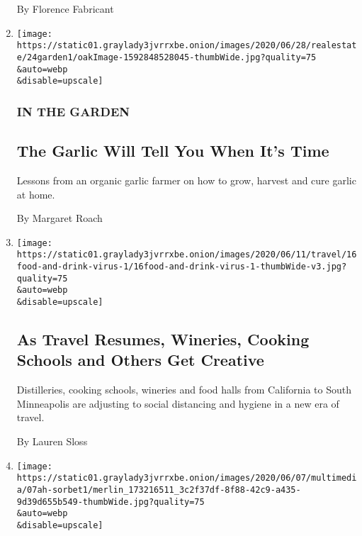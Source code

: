\begin{enumerate}
  By Florence Fabricant
\item
  \href{/2020/06/24/realestate/grow-garlic-garden-organic.html}{}

  \texttt{[image: https://static01.graylady3jvrrxbe.onion/images/2020/06/28/realestate/24garden1/oakImage-1592848528045-thumbWide.jpg?quality=75\\\&auto=webp\\\&disable=upscale]}

  \hypertarget{in-the-garden}{%
  \subsubsection{IN THE GARDEN}\label{in-the-garden}}

  \hypertarget{the-garlic-will-tell-you-when-its-time}{%
  \subsection{The Garlic Will Tell You When It's
  Time}\label{the-garlic-will-tell-you-when-its-time}}

  Lessons from an organic garlic farmer on how to grow, harvest and cure
  garlic at home.

  By Margaret Roach
\item
  \href{/2020/06/16/travel/wineries-distilleries-farm-stay-cooking-schools-virus.html}{}

  \texttt{[image: https://static01.graylady3jvrrxbe.onion/images/2020/06/11/travel/16food-and-drink-virus-1/16food-and-drink-virus-1-thumbWide-v3.jpg?quality=75\\\&auto=webp\\\&disable=upscale]}

  \hypertarget{as-travel-resumes-wineries-cooking-schools-and-others-get-creative}{%
  \subsection{As Travel Resumes, Wineries, Cooking Schools and Others
  Get
  Creative}\label{as-travel-resumes-wineries-cooking-schools-and-others-get-creative}}

  Distilleries, cooking schools, wineries and food halls from California
  to South Minneapolis are adjusting to social distancing and hygiene in
  a new era of travel.

  By Lauren Sloss
\item
  \href{/2020/06/05/at-home/how-to-make-sorbet.html}{}

  \texttt{[image: https://static01.graylady3jvrrxbe.onion/images/2020/06/07/multimedia/07ah-sorbet1/merlin\_173216511\_3c2f37df-8f88-42c9-a435-9d39d655b549-thumbWide.jpg?quality=75\\\&auto=webp\\\&disable=upscale]}


\end{enumerate}
